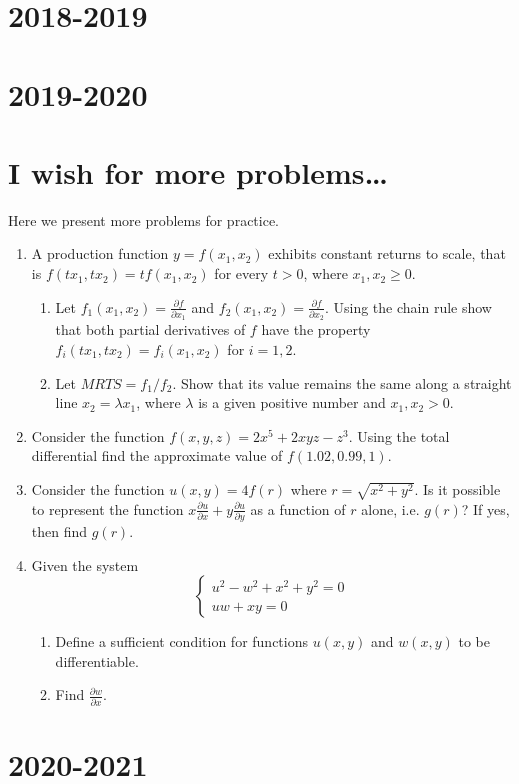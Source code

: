 \documentclass[12pt]{article} %
\theoremstyle{definition} %
\begin{document}
\section{2018-2019}





\section{2019-2020}




\section{I wish for more problems\ldots}

Here we present more problems for practice.

\begin{enumerate}
\item A production function $y=f(x_1, x_2)$ exhibits constant returns to scale, 
that is $f(tx_1,tx_2)=tf(x_1,x_2)$ for every $t>0$, where $x_1, x_2 \geq 0$.
\begin{enumerate}
\item Let $f_1(x_1,x_2)=\frac{\partial f}{\partial x_1}$ and $f_2(x_1,x_2)=\frac{\partial f}{\partial x_2}$. 
Using the chain rule show that both partial derivatives of $f$ have the property $f_i(tx_1,tx_2)=f_i(x_1,x_2)$ for $i=1,2$.
\item Let $MRTS=f_1/f_2$. Show that its value remains the same along a straight line $x_2=\lambda x_1$,
 where $\lambda$ is a given positive number and $x_1, x_2>0$.
\end{enumerate}

\item Consider the function $f(x,y,z)=2x^5+2xyz-z^3$. 
Using the total differential find the approximate value of $f(1.02,0.99,1)$.

\item Consider the function $u(x,y)=4f(r)$ where $r=\sqrt{x^2+y^2}$. 
Is it possible to represent the function $x\frac{\partial u}{\partial x}+y\frac{\partial u}{\partial y}$ as a function of $r$ alone, i.e. $g(r)$? If yes, then find $g(r)$.

\item Given the system
\begin{equation} \nonumber
\begin{cases}
u^2-w^2+x^2+y^2=0 \\
uw+xy=0
\end{cases}
\end{equation}
\begin{enumerate}
\item Define a sufficient condition for functions $u(x,y)$ and $w(x,y)$ to be differentiable.
\item Find $\frac{\partial w}{\partial x}$.
\end{enumerate}

\end{enumerate}

\section{2020-2021}


\end{document}
